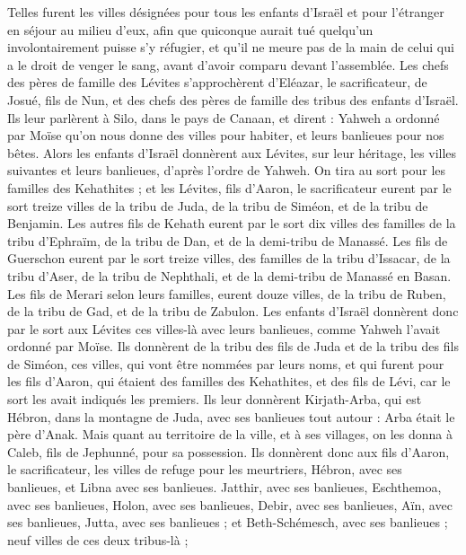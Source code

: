 \begin{multicols}{2}
Telles furent les villes désignées pour tous les enfants d’Israël et pour l’étranger en séjour au milieu d’eux, afin que quiconque aurait tué quelqu’un involontairement puisse s’y réfugier, et qu’il ne meure pas de la main de celui qui a le droit de venger le sang, avant d’avoir comparu devant l’assemblée.
\VerseOne{}Les chefs des pères de famille des Lévites s’approchèrent d’Eléazar, le sacrificateur, de Josué, fils de Nun, et des chefs des pères de famille des tribus des enfants d’Israël.
Ils leur parlèrent à Silo, dans le pays de Canaan, et dirent : Yahweh a ordonné par Moïse qu’on nous donne des villes pour habiter, et leurs banlieues pour nos bêtes.
Alors les enfants d’Israël donnèrent aux Lévites, sur leur héritage, les villes suivantes et leurs banlieues, d’après l’ordre de Yahweh.
On tira au sort pour les familles des Kehathites ; et les Lévites, fils d’Aaron, le sacrificateur eurent par le sort treize villes de la tribu de Juda, de la tribu de Siméon, et de la tribu de Benjamin.
Les autres fils de Kehath eurent par le sort dix villes des familles de la tribu d’Ephraïm, de la tribu de Dan, et de la demi-tribu de Manassé.
Les fils de Guerschon eurent par le sort treize villes, des familles de la tribu d’Issacar, de la tribu d’Aser, de la tribu de Nephthali, et de la demi-tribu de Manassé en Basan.
Les fils de Merari selon leurs familles, eurent douze villes, de la tribu de Ruben, de la tribu de Gad, et de la tribu de Zabulon.
Les enfants d’Israël donnèrent donc par le sort aux Lévites ces villes-là avec leurs banlieues, comme Yahweh l’avait ordonné par Moïse.
Ils donnèrent de la tribu des fils de Juda et de la tribu des fils de Siméon, ces villes, qui vont être nommées par leurs noms,
et qui furent pour les fils d’Aaron, qui étaient des familles des Kehathites, et des fils de Lévi, car le sort les avait indiqués les premiers.
Ils leur donnèrent Kirjath-Arba, qui est Hébron, dans la montagne de Juda, avec ses banlieues tout autour : Arba était le père d’Anak.
Mais quant au territoire de la ville, et à ses villages, on les donna à Caleb, fils de Jephunné, pour sa possession.
Ils donnèrent donc aux fils d’Aaron, le sacrificateur, les villes de refuge pour les meurtriers, Hébron, avec ses banlieues, et Libna avec ses banlieues.
Jatthir, avec ses banlieues, Eschthemoa, avec ses banlieues,
Holon, avec ses banlieues, Debir, avec ses banlieues,
Aïn, avec ses banlieues, Jutta, avec ses banlieues ; et Beth-Schémesch, avec ses banlieues ; neuf villes de ces deux tribus-là ;

\end{multicols}
